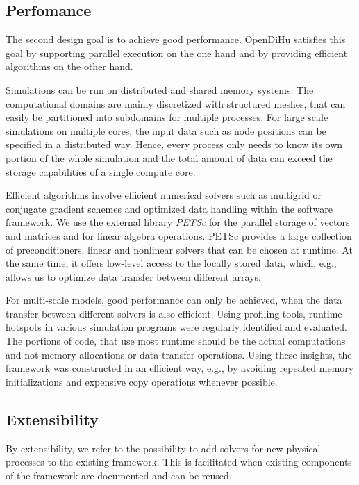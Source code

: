 \subsection{Perfomance}
The second design goal is to achieve good performance.
OpenDiHu satisfies this goal by supporting parallel execution on the one hand and by providing efficient algorithms on the other hand. 

Simulations can be run on distributed and shared memory systems. The computational domains are mainly discretized with structured meshes, that can easily be partitioned into subdomains for multiple processes. For large scale simulations on multiple cores, the input data such as node positions can be specified in a distributed way. Hence, every process only needs to know its own portion of the whole simulation and the total amount of data can exceed the storage capabilities of a single compute core.

Efficient algorithms involve efficient numerical solvers such as multigrid or conjugate gradient schemes and optimized data handling within the software framework.
We use the external library \emph{PETSc} \cite{petsc-efficient1997} for the parallel storage of vectors and matrices and for linear algebra operations. PETSc provides a large collection of preconditioners, linear and nonlinear solvers that can be chosen at runtime. At the same time, it offers low-level access to the locally stored data, which, e.g., allows us to optimize data transfer between different arrays.

For multi-scale models, good performance can only be achieved, when the data transfer between different solvers is also efficient. Using profiling tools, runtime hotspots in various simulation programs were regularly identified and evaluated. The portions of code, that use  most runtime should be the actual computations and not memory allocations or data transfer operations.
Using these insights, the framework was constructed in an efficient way, e.g., by avoiding repeated memory initializations and expensive copy operations whenever possible.

\subsection{Extensibility}
By extensibility, we refer to the possibility to add solvers for new physical processes to the existing framework.
This is facilitated when existing components of the framework are documented and can be reused. 

